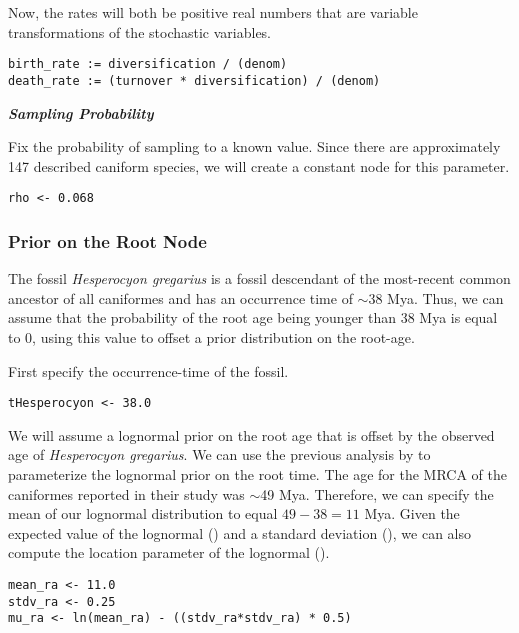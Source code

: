 Now, the rates will both be positive real numbers that are variable transformations of the stochastic variables.
{\tt \begin{snugshade*}
\begin{lstlisting}
birth_rate := diversification / (denom)
death_rate := (turnover * diversification) / (denom)
\end{lstlisting}
\end{snugshade*}}

\textbf{\textit{Sampling Probability}}

Fix the probability of sampling to a known value. Since there are approximately 147 described caniform species, we will create a constant node for this parameter.
{\tt \begin{snugshade*}
\begin{lstlisting}
rho <- 0.068
\end{lstlisting}
\end{snugshade*}}

\subsubsection{Prior on the Root Node}

The fossil \textit{Hesperocyon gregarius} is a fossil descendant of the most-recent common ancestor of all caniformes and has an occurrence time of $\sim$38 Mya.
Thus, we can assume that the probability of the root age being younger than 38 Mya is equal to 0, using this value to offset a prior distribution on the root-age.

First specify the occurrence-time of the fossil.
{\tt \begin{snugshade*}
\begin{lstlisting}
tHesperocyon <- 38.0
\end{lstlisting}
\end{snugshade*}}

We will assume a lognormal prior on the root age that is offset by the observed age of \textit{Hesperocyon gregarius}. 
We can use the previous analysis by \citet{dosReis2012} to parameterize the lognormal prior on the root time. 
The age for the MRCA of the caniformes reported in their study was $\sim$49 Mya. 
Therefore, we can specify the mean of our lognormal distribution to equal $49 - 38 = 11$ Mya.
Given the expected value of the lognormal () and a standard deviation (), we can also compute the location parameter of the lognormal ().
{\tt \begin{snugshade*}
\begin{lstlisting}
mean_ra <- 11.0
stdv_ra <- 0.25
mu_ra <- ln(mean_ra) - ((stdv_ra*stdv_ra) * 0.5)
\end{lstlisting}
\end{snugshade*}}

